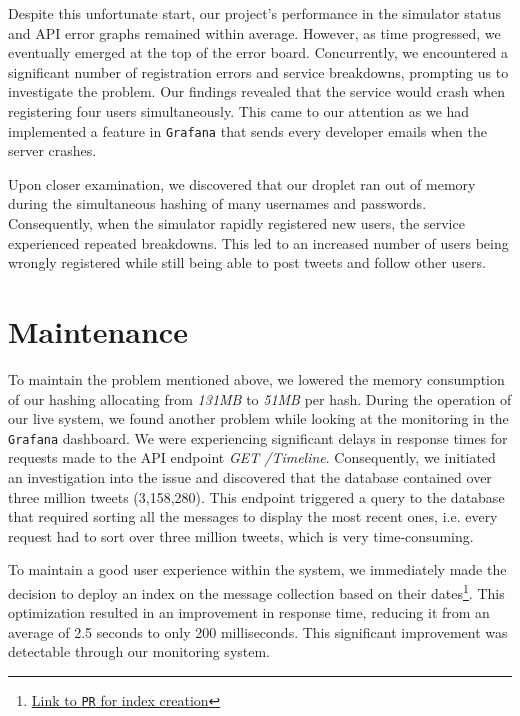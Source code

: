 Despite this unfortunate start, our project's performance in the simulator status and API error graphs remained within average. However, as time progressed, we eventually emerged at the top of the error board. Concurrently, we encountered a significant number of registration errors and service breakdowns, prompting us to investigate the problem. Our findings revealed that the service would crash when registering four users simultaneously. This came to our attention as we had implemented a feature in \texttt{Grafana} that sends every developer emails when the server crashes. 

Upon closer examination, we discovered that our droplet ran out of memory during the simultaneous hashing of many usernames and passwords. Consequently, when the simulator rapidly registered new users, the service experienced repeated breakdowns. This led to an increased number of users being wrongly registered while still being able to post tweets and follow other users. 

\section{Maintenance}

To maintain the problem mentioned above, we lowered the memory consumption of our hashing allocating from \textit{131MB} to \textit{51MB} per hash. During the operation of our live system, we found another problem while looking at the monitoring in the \texttt{Grafana} dashboard. We were experiencing significant delays in response times for requests made to the API endpoint \textit{GET /Timeline}. Consequently, we initiated an investigation into the issue and discovered that the database contained over three million tweets (3,158,280). This endpoint triggered a query to the database that required sorting all the messages to display the most recent ones, i.e. every request had to sort over three million tweets, which is very time-consuming.

To maintain a good user experience within the system, we immediately made the decision to deploy an index on the message collection based on their dates\footnote{\href{https://github.com/simonskodt/itu-minitwit/pull/160/files\#diff-5eb5a300effc823f5495041811fa663ed657a763a0ff63594a760f31967e8733}{Link to \texttt{PR} for index creation}}. This optimization resulted in an improvement in response time, reducing it from an average of 2.5 seconds to only 200 milliseconds. This significant improvement was detectable through our monitoring system.

